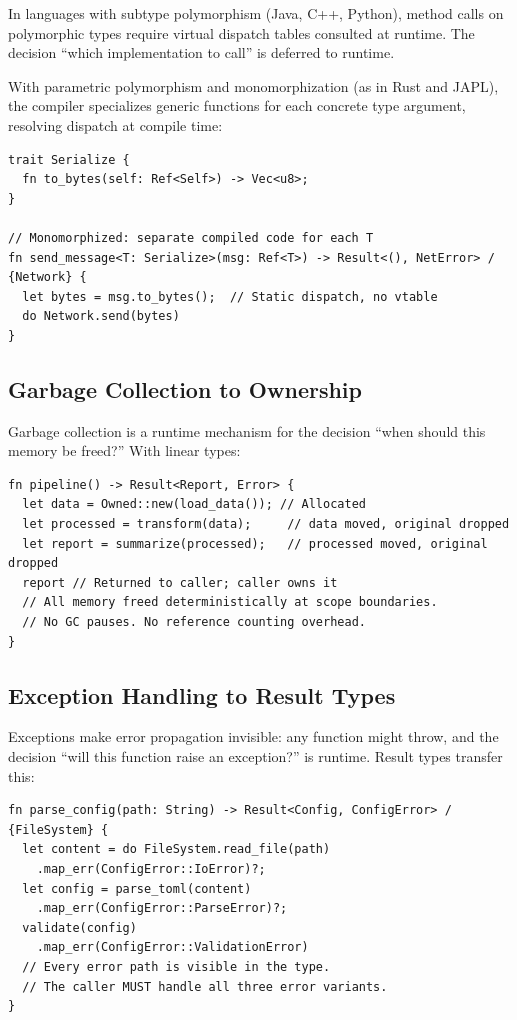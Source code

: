 \documentclass[11pt]{article}
\begin{document}
In languages with subtype polymorphism (Java, C++, Python), method calls on
polymorphic types require virtual dispatch tables consulted at runtime. The decision
``which implementation to call'' is deferred to runtime.

With parametric polymorphism and monomorphization (as in Rust and JAPL), the compiler
specializes generic functions for each concrete type argument, resolving dispatch at
compile time:

\begin{lstlisting}[caption={Monomorphization eliminates runtime dispatch in JAPL}]
trait Serialize {
  fn to_bytes(self: Ref<Self>) -> Vec<u8>;
}

// Monomorphized: separate compiled code for each T
fn send_message<T: Serialize>(msg: Ref<T>) -> Result<(), NetError> / {Network} {
  let bytes = msg.to_bytes();  // Static dispatch, no vtable
  do Network.send(bytes)
}
\end{lstlisting}

\subsection{Garbage Collection to Ownership}

Garbage collection is a runtime mechanism for the decision ``when should this memory
be freed?'' With linear types:

\begin{lstlisting}[caption={Ownership eliminates garbage collection in JAPL}]
fn pipeline() -> Result<Report, Error> {
  let data = Owned::new(load_data()); // Allocated
  let processed = transform(data);     // data moved, original dropped
  let report = summarize(processed);   // processed moved, original dropped
  report // Returned to caller; caller owns it
  // All memory freed deterministically at scope boundaries.
  // No GC pauses. No reference counting overhead.
}
\end{lstlisting}

\subsection{Exception Handling to Result Types}

Exceptions make error propagation invisible: any function might throw, and the decision
``will this function raise an exception?'' is runtime. Result types transfer this:

\begin{lstlisting}[caption={Result types transfer error decisions to compile time in JAPL}]
fn parse_config(path: String) -> Result<Config, ConfigError> / {FileSystem} {
  let content = do FileSystem.read_file(path)
    .map_err(ConfigError::IoError)?;
  let config = parse_toml(content)
    .map_err(ConfigError::ParseError)?;
  validate(config)
    .map_err(ConfigError::ValidationError)
  // Every error path is visible in the type.
  // The caller MUST handle all three error variants.
}
\end{lstlisting}
\end{document}
